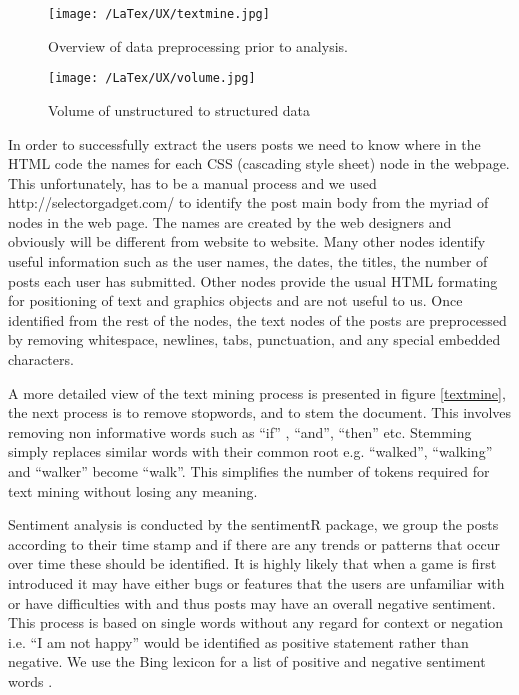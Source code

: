 \documentclass{svproc}
\begin{document}
\begin{figure}[h]
	\centering
	\begin{minipage}{0.40\textwidth}
		\centering
		\texttt{[image: /LaTex/UX/textmine.jpg]} %
		\centering \caption{Overview of data preprocessing  prior to analysis.}
		\label{textmine}
	\end{minipage} \hfill
	\begin{minipage}{0.40 \textwidth}
		\centering
		\texttt{[image: /LaTex/UX/volume.jpg]} %
		\centering \caption{Volume of unstructured to structured data}
		\label{volume}
	\end{minipage}
\end{figure}

In order to successfully extract the users posts we need to know where in the HTML code the names for each CSS (cascading style sheet) node in the webpage. This unfortunately, has to be a manual process and we used  http://selectorgadget.com/ to identify the post main body from the myriad of nodes in the web page. The names are created by the web designers and obviously will be different from website to website. Many other nodes identify useful information such as the user names, the dates, the titles, the number of posts each user has submitted. Other nodes provide the usual HTML formating for positioning of text and graphics objects and are not useful to us. Once identified from the rest of the nodes, the text nodes  of the posts are preprocessed by removing whitespace, newlines, tabs, punctuation, and any special embedded characters.

A more detailed view of the text mining process is presented in figure \ref{textmine}, the next process is to remove stopwords, and to stem the document. This involves removing non informative words such as ``if'' , ``and'', ``then'' etc. Stemming simply replaces similar words with their common root e.g. ``walked'', ``walking'' and ``walker'' become ``walk''. This simplifies the number of tokens required for text mining without losing any meaning. 

Sentiment analysis is conducted by the sentimentR package, we group the posts according to their time stamp and if there are any trends or patterns that occur over time these should be identified. It is highly likely that when a game is first introduced it may have either bugs or features that the users are unfamiliar with or have difficulties with and thus posts may have an overall negative sentiment. This process is based on single words without any regard for context or negation i.e. ``I am not happy'' would be identified as positive statement rather than negative. We use the Bing lexicon for a list of positive and negative sentiment words  \cite{Hu2004}.
\end{document}
